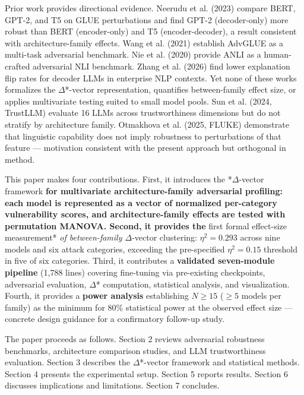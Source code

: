 Prior work provides directional evidence. Neerudu et al. (2023) compare BERT, GPT-2, and T5 on GLUE perturbations and find GPT-2 (decoder-only) more robust than BERT (encoder-only) and T5 (encoder-decoder), a result consistent with architecture-family effects. Wang et al. (2021) establish AdvGLUE as a multi-task adversarial benchmark. Nie et al. (2020) provide ANLI as a human-crafted adversarial NLI benchmark. Zhang et al. (2026) find lower explanation flip rates for decoder LLMs in enterprise NLP contexts. Yet none of these works formalizes the $\Delta$*-vector representation, quantifies between-family effect size, or applies multivariate testing suited to small model pools. Sun et al. (2024, TrustLLM) evaluate 16 LLMs across trustworthiness dimensions but do not stratify by architecture family. Otmakhova et al. (2025, FLUKE) demonstrate that linguistic capability does not imply robustness to perturbations of that feature --- motivation consistent with the present approach but orthogonal in method.

This paper makes four contributions. First, it introduces the *\textit{$\Delta$}-vector framework\textbf{ for multivariate architecture-family adversarial profiling: each model is represented as a vector of normalized per-category vulnerability scores, and architecture-family effects are tested with permutation MANOVA. Second, it provides the }first formal effect-size measurement*\textit{ of between-family $\Delta$}-vector clustering: $\eta^{2}=0.293$ across nine models and six attack categories, exceeding the pre-specified $\eta^{2}=0.15$ threshold in five of six categories. Third, it contributes a \textbf{validated seven-module pipeline} (1,788 lines) covering fine-tuning via pre-existing checkpoints, adversarial evaluation, $\Delta$* computation, statistical analysis, and visualization. Fourth, it provides a \textbf{power analysis} establishing $N\geq 15$ ($\geq 5$ models per family) as the minimum for 80\% statistical power at the observed effect size --- concrete design guidance for a confirmatory follow-up study.

The paper proceeds as follows. Section 2 reviews adversarial robustness benchmarks, architecture comparison studies, and LLM trustworthiness evaluation. Section 3 describes the $\Delta$*-vector framework and statistical methods. Section 4 presents the experimental setup. Section 5 reports results. Section 6 discusses implications and limitations. Section 7 concludes.

